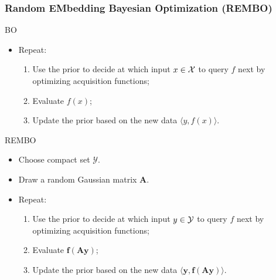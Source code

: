 \documentclass[grey]{beamer}
\begin{document}
 \begin{frame}
  \frametitle{Random EMbedding Bayesian Optimization (REMBO)}
  
  \begin{block}{BO}
   \begin{itemize}
   \item Repeat:
   \begin{enumerate}
    \item Use the prior to decide at which input $x \in \cal X$ to query $f$ next
    by optimizing acquisition functions;
    \item Evaluate $f(x)$;
    \item Update the prior based on the new data 
    $\langle{}y, f(x)\rangle$.
   \end{enumerate} 
  \end{itemize}
  \end{block}
  
   
  \begin{block}{REMBO}
    \begin{itemize}
   \item Choose compact set {\bf \textcolor{myColor}{$\mathbf{\mathcal{Y}}$}}.
   \item Draw a random Gaussian matrix \textcolor{myColor}{$\mathbf{A}$}.
   \item Repeat:
   \begin{enumerate}
    \item Use the prior to decide at which input $y \in \cal Y$ to query $f$ next
    by optimizing acquisition functions;
    \item Evaluate {\bf \textcolor{myColor}{$\mathbf{f(Ay)}$}};
    \item Update the prior based on the new data 
    {\bf \textcolor{myColor}{$\mathbf{\langle{}y, f(Ay)\rangle}$}}.
   \end{enumerate}
  \end{itemize}
  \end{block}

  
 \end{frame}
\end{document}

